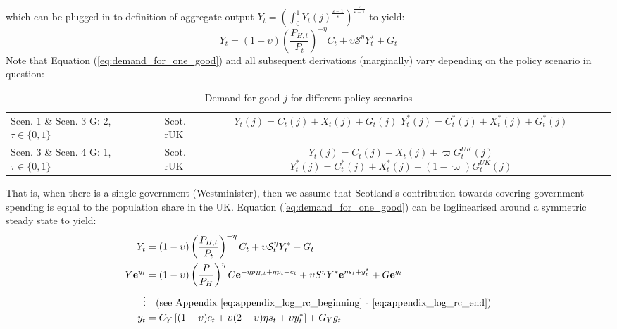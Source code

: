 which can be plugged in to definition of aggregate output $Y_t = \left( \int_{0}^{1} Y_t(j)^{\frac{\varepsilon-1}{\varepsilon}}\right)^{\frac{\varepsilon}{\varepsilon-1}}$ to yield:
\begin{equation}
    Y_t = (1-\upsilon) \left(\frac{P_{H,t}}{P_t}\right)^{-\eta}C_t + \upsilon \mathcal{S}^\eta Y^\star_t + G_t
\end{equation}
Note that Equation (\ref{eq:demand_for_one_good}) and all subsequent derivations (marginally) vary depending on the policy scenario in question:
\begin{table}[H]
    \renewcommand{\arraystretch}{2}
    \centering
    \begin{tabular}{l|l|c}
    \makecell{Scen. 1 \& Scen. 3\\ G: 2, $\tau \in \{0, 1\}$} & \makecell{Scot. \\ rUK } & 
        \makecell{
            $Y_t(j) = C_t(j) + X_t(j) + G_t(j)$\\
            $Y^*_t(j) = C^*_t(j) + X^*_t(j) + G^*_t(j)$
        }  \\ 
    \makecell{Scen. 3 \& Scen. 4\\ G: 1, $\tau \in \{0, 1\}$} & \makecell{Scot. \\ rUK } & 
        \makecell{
            $Y_t(j) = C_t(j) + X_t(j) + \varpi G^{UK}_t(j)$\\
            $Y^*_t(j) = C^*_t(j) + X^*_t(j) + (1-\varpi) G^{UK}_t(j)$
        }   
    \end{tabular}
    \caption{Demand for good $j$ for different policy scenarios}
\end{table}
That is, when there is a single government (Westminister), then we assume that Scotland's contribution towards covering government spending is equal to the population share in the UK. Equation (\ref{eq:demand_for_one_good}) can be loglinearised around a symmetric steady state to yield:
\begin{align}
    Y_t &= (1-\upsilon)\left(\frac{P_{H,t}}{P_t}\right)^{-\eta}C_t + \upsilon \mathcal{S}_t^{\eta}Y_t^* + G_t\\
    Y \mathbf{e}^{y_t} &= (1-\upsilon)\left(\frac{P}{P_{H}}\right)^{\eta}C \mathbf{e}^{-\eta p_{H,t} + \eta p_t + c_t}+ \upsilon S^{\eta} Y^* \mathbf{e}^{\eta s_t + y^*_t} + G \mathbf{e}^{g_t}\\
    \vdots & \quad \text{(see Appendix \ref{eq:appendix_log_rc_beginning} - \ref{eq:appendix_log_rc_end})} \nonumber \\
    y_t &= C_Y\left[(1-\upsilon)c_t + \upsilon (2-\upsilon)\eta s_t + \upsilon y^*_t\right] + G_Y g_t \label{eq:aggregate_rc}
\end{align}
